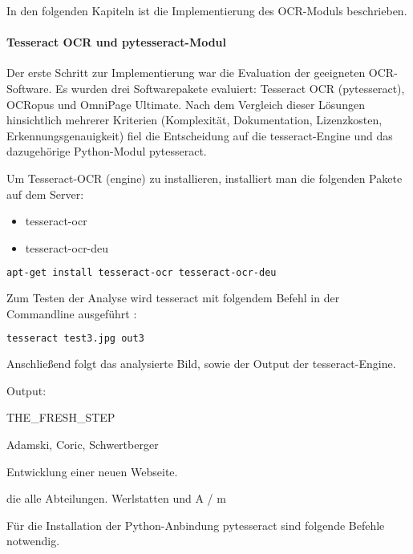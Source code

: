 In den folgenden Kapiteln ist die Implementierung des OCR-Moduls beschrieben.
\paragraph{Tesseract OCR und pytesseract-Modul}
Der erste Schritt zur Implementierung war die Evaluation der geeigneten OCR-Software. Es wurden drei Softwarepakete evaluiert: Tesseract OCR (pytesseract), OCRopus und OmniPage Ultimate. Nach dem Vergleich dieser Lösungen hinsichtlich mehrerer Kriterien (Komplexität, Dokumentation, Lizenzkosten, Erkennungsgenauigkeit) fiel die Entscheidung auf die tesseract-Engine und das dazugehörige Python-Modul pytesseract.

Um Tesseract-OCR (engine) zu installieren, installiert man die folgenden Pakete auf dem Server:
\begin{itemize}
\item tesseract-ocr
\item tesseract-ocr-deu
\end{itemize}

\begin{lstlisting}[caption={tesseract-Installation}, language=bash]
apt-get install tesseract-ocr tesseract-ocr-deu
\end{lstlisting}

Zum Testen der Analyse wird tesseract mit folgendem Befehl in der Commandline ausgeführt \cite{TESS1, TESS2}:
\begin{lstlisting}[caption={tesseract-Ausführung}, language=bash]
tesseract test3.jpg out3
\end{lstlisting}

\newpage

Anschließend folgt das analysierte Bild, sowie der Output der tesseract-Engine.


Output:

THE\_FRESH\_STEP

Adamski, Coric, Schwertberger

Entwicklung einer neuen Webseite.

die alle Abteilungen. Werlstatten und A / m

Für die Installation der Python-Anbindung pytesseract sind folgende Befehle notwendig. \cite{PYTES, PYTES2, PYTES3}

